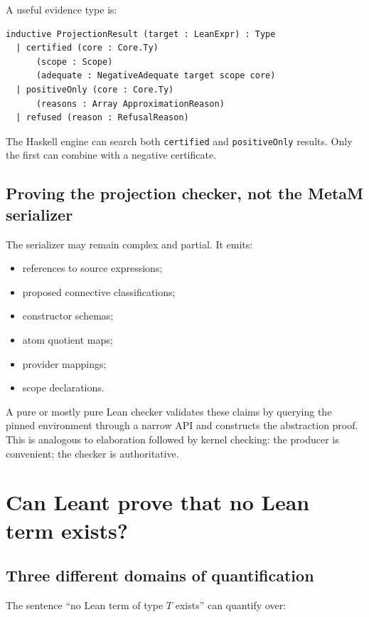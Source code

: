\documentclass[11pt,letterpaper,openany]{report}
\theoremstyle{definition}
\theoremstyle{remark}
\newcommand{\code}[1]{\texttt{#1}}
\begin{document}
A useful evidence type is:

\begin{lstlisting}[language=LeanFour,caption={Projection result with explicit proof strength.}]
inductive ProjectionResult (target : LeanExpr) : Type
  | certified (core : Core.Ty)
      (scope : Scope)
      (adequate : NegativeAdequate target scope core)
  | positiveOnly (core : Core.Ty)
      (reasons : Array ApproximationReason)
  | refused (reason : RefusalReason)
\end{lstlisting}

The Haskell engine can search both \code{certified} and \code{positiveOnly} results. Only the first can combine with a negative certificate.

\section{Proving the projection checker, not the MetaM serializer}

The serializer may remain complex and partial. It emits:

\begin{itemize}
\item references to source expressions;
\item proposed connective classifications;
\item constructor schemas;
\item atom quotient maps;
\item provider mappings;
\item scope declarations.
\end{itemize}

A pure or mostly pure Lean checker validates these claims by querying the pinned environment through a narrow API and constructs the abstraction proof. This is analogous to elaboration followed by kernel checking: the producer is convenient; the checker is authoritative.

\chapter{Can Leant prove that no Lean term exists?}
\label{ch:no-lean-term}

\section{Three different domains of quantification}

The sentence ``no Lean term of type \(T\) exists'' can quantify over:
\end{document}
